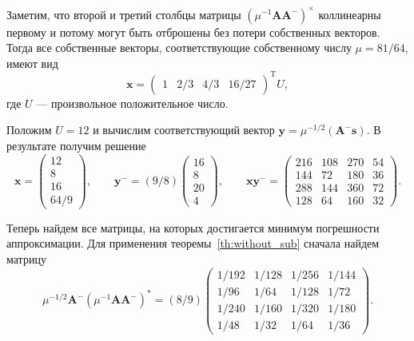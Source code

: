 \documentclass[specialist,
               substylefile = spbu.rtx,
               subf,href,colorlinks=true, 12pt]{disser}
\DeclareMathOperator{\T}{T}
\theoremstyle{definition}
\begin{document}
Заметим, что второй и третий столбцы матрицы $(\mu^{-1}\bm{A}\bm{A}^{-})^{\times}$ коллинеарны первому и потому могут быть отброшены без потери собственных векторов. Тогда все собственные векторы, соответствующие собственному числу $\mu=81/64$, имеют вид 
\begin{equation*}
\bm{x}
=
\begin{pmatrix}
1 &2/3 &4/3 &16/27
\end{pmatrix}^{\T}
U,
\end{equation*}
где $U$ --- произвольное положительное число.

Положим $U=12$ и вычислим соответствующий вектор $\bm{y}=\mu^{-1/2}(\bm{A}^{-}\bm{s})$. В результате получим решение
\begin{equation*}
\bm{x}
=
\begin{pmatrix}
12\\8\\16\\64/9
\end{pmatrix},
\qquad
\bm{y}^{-}
=
(9/8)
\begin{pmatrix}
16\\8\\20\\4
\end{pmatrix},
\qquad
\bm{x}\bm{y}^{-}
=
\left(
\begin{array}{cccc}
216 & 108 & 270 & 54
\\
144 & 72 & 180 & 36
\\
288 & 144 & 360 & 72
\\
128 & 64 & 160 & 32
\end{array}
\right).
\end{equation*}

Теперь найдем все матрицы, на которых достигается минимум погрешности аппроксимации. Для применения теоремы~\ref{th:without_sub} сначала найдем матрицу
\begin{equation*}
\mu^{-1/2}\bm{A}^{-}(\mu^{-1}\bm{A}\bm{A}^{-})^{\ast}
=
(8/9)
\left(
\begin{array}{cccc}
1/192 & 1/128 & 1/256 & 1/144
\\
1/96 & 1/64 & 1/128 & 1/72
\\
1/240 & 1/160 & 1/320 & 1/180
\\
1/48 & 1/32 & 1/64 & 1/36
\end{array}
\right).
\end{equation*}
\end{document}
